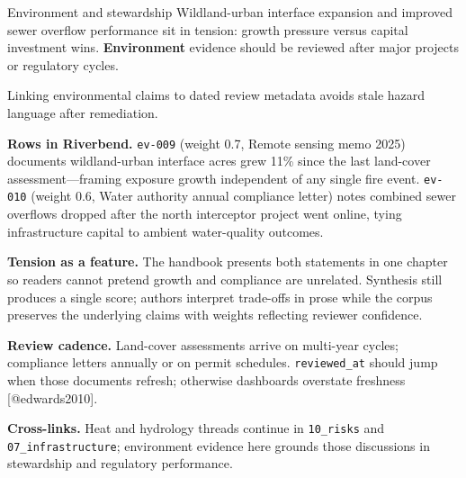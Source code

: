\documentclass[
  ignorenonframetext,
]{beamer}
\author{\texorpdfstring{}{}}
\date{}
\begin{document}
\begin{frame}[fragile]{Environment and stewardship}
\protect{}\label{environment-and-stewardship}
Wildland-urban interface expansion and improved sewer overflow
performance sit in tension: growth pressure versus capital investment
wins. \textbf{Environment} evidence should be reviewed after major
projects or regulatory cycles.

Linking environmental claims to dated review metadata avoids stale
hazard language after remediation.

\textbf{Rows in Riverbend.} \texttt{ev-009} (weight 0.7, Remote sensing
memo 2025) documents wildland-urban interface acres grew 11\% since the
last land-cover assessment---framing exposure growth independent of any
single fire event. \texttt{ev-010} (weight 0.6, Water authority annual
compliance letter) notes combined sewer overflows dropped after the
north interceptor project went online, tying infrastructure capital to
ambient water-quality outcomes.

\textbf{Tension as a feature.} The handbook presents both statements in
one chapter so readers cannot pretend growth and compliance are
unrelated. Synthesis still produces a single score; authors interpret
trade-offs in prose while the corpus preserves the underlying claims
with weights reflecting reviewer confidence.

\textbf{Review cadence.} Land-cover assessments arrive on multi-year
cycles; compliance letters annually or on permit schedules.
\texttt{reviewed\_at} should jump when those documents refresh;
otherwise dashboards overstate freshness {[}@edwards2010{]}.

\textbf{Cross-links.} Heat and hydrology threads continue in
\texttt{10\_risks} and \texttt{07\_infrastructure}; environment evidence
here grounds those discussions in stewardship and regulatory
performance.
\end{frame}
\end{document}

